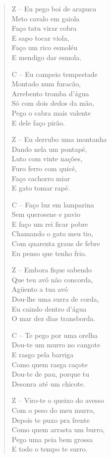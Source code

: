 \begin{verse}
Z – Eu pego boi de arapuca\\
Meto cavalo em gaiola\\
Faço tatu virar cobra\\
E sapo tocar viola,\\
Faço um rico esmoléu\\
E mendigo dar esmola.

C – Eu campeio tempestade\\
Montado num furacão,\\
Arrebento tromba d’água\\
Só com dois dedos da mão,\\
Pego o cabra mais valente\\
E dele faço pirão.


Z – Eu derrubo uma montanha\\
Dando nela um pontapé,\\
Luto com vinte nações,\\
Furo ferro com quicé,\\
Faço cachorro miar\\
E gato tomar rapé.

C – Faço luz em lamparina\\
Sem querosene e pavio\\
E faço um rei ficar pobre\\
Chamando o gato meu tio,\\
Com quarenta graus de febre\\
Eu penso que tenho frio.

Z – Embora fique sabendo\\
Que teu avô não concorda,\\
Agüento a tua avó\\
Dou-lhe uma surra de corda,\\
Eu caindo dentro d’água\\
O mar dez dias transborda.

C – Te pego por uma orelha\\
Dou-te um murro no cangote\\
E rasgo pela barriga\\
Como quem rasga caçote\\
Dou-te de pau, porque tu\\
Desonra até um chicote.


Z – Viro-te o queixo do avesso\\
Com o peso do meu murro,\\
Depois te puxo pra frente\\
Como quem arrasta um burro,\\
Pego uma peia bem grossa\\
E todo o tempo te surro.


\end{verse}
